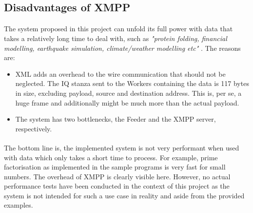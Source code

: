 \subsection{Disadvantages of XMPP}
\paragraph{}
The system proposed in this project can unfold its full power with data that takes a relatively long time to deal with, such as \textit{"protein folding, financial modelling, earthquake simulation, climate/weather modelling etc"} \cite{wikipedia005}. The reasons are:
\begin{itemize}
\item XML adds an overhead to the wire communication that should not be neglected. The IQ stanza sent to the Workers containing the data is 117 bytes in size, excluding payload, source and destination address. This is, per se, a huge frame and additionally might be much more than the actual payload.
\item The system has two bottlenecks, the Feeder and the XMPP server, respectively.
\end{itemize}

\paragraph{}
The bottom line is, the implemented system is not very performant when used with data which only takes a short time to process. For example, prime factorisation as implemented in the sample programs is very fast for small numbers. The overhead of XMPP is clearly visible here. However, no actual performance tests have been conducted in the context of this project as the system is not intended for such a use case in reality and aside from the provided examples.

